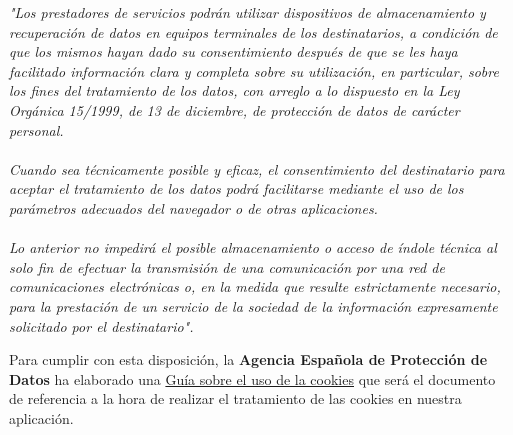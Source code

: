 \textit{"Los prestadores de servicios podrán utilizar dispositivos de almacenamiento y recuperación de datos en equipos terminales de los destinatarios, a condición de que los mismos hayan dado su consentimiento después de que se les haya facilitado información clara y completa sobre su utilización, en particular, sobre los fines del tratamiento de los datos, con arreglo a lo dispuesto en la Ley Orgánica 15/1999, de 13 de diciembre, de protección de datos de carácter personal. \\ \\ Cuando sea técnicamente posible y eficaz, el consentimiento del destinatario para aceptar el tratamiento de los datos podrá facilitarse mediante el uso de los parámetros adecuados del navegador o de otras aplicaciones. \\ \\ Lo anterior no impedirá el posible almacenamiento o acceso de índole técnica al solo fin de efectuar la transmisión de una comunicación por una red de comunicaciones electrónicas o, en la medida que resulte estrictamente necesario, para la prestación de un servicio de la sociedad de la información expresamente solicitado por el destinatario".}

Para cumplir con esta disposición, la \textbf{Agencia Española de Protección de Datos} ha elaborado una \href{https://www.aepd.es/guias/guia-cookies.pdf}{Guía sobre el uso de la cookies} que será el documento de referencia a la hora de realizar el tratamiento de las cookies en nuestra aplicación.








%

